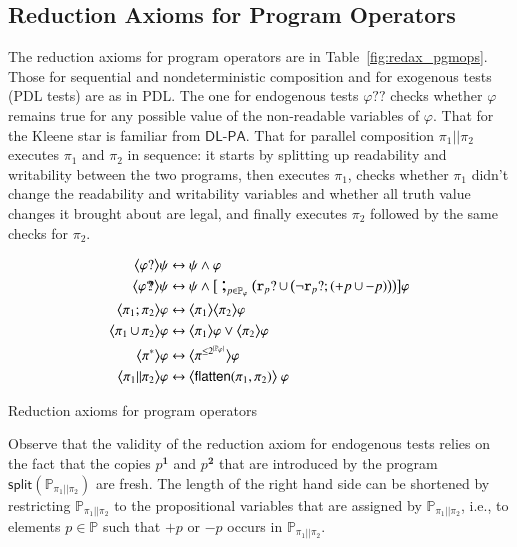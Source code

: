\documentclass{llncs}
\newcommand{\progsplit}{\mathsf{split}}
\newcommand{\progFlatten}{\mathsf{flatten}}
\newcommand{\atm}{x}
\newcommand{\cp}[2]{{#2}^\mathbf{#1}}
\newcommand{\pll}{ {||} }							%
\newcommand{\readable}[1]{\mathtt{r}_{#1}}
\newcommand{\testendo}{?\!\!?}			%
\newcommand{\testpdl}{?}				%
\newcommand{\Dlpa}{\ensuremath{\mathsf{DL\text{-}PA}}\xspace}
\newcommand{\assgntopV}[1]{{\mathtt {+} #1}}
\newcommand{\assgnbotV}[1]{{\mathtt {-} #1}}
\newcommand{\card}[1]{|#1|}
\newcommand{\lbox}[1]{ \big[ #1 \big] }
\newcommand{\ldia}[1]{ \big\langle #1 \big\rangle}
\newcommand{\leqv}{ \leftrightarrow }
\newcommand{\ndet}{\,{\cup}\,}
\renewcommand{\phi}{\varphi}
\newcommand{\propset}{\mathbb P}
\newcommand{\propsetOf}[1]{\propset_{#1}}
\newcommand{\seqseq}[1]{ \text{\Large ;}_{#1} ~ }
\begin{document}
\subsection{Reduction Axioms for Program Operators}\label{sec:redax_pgmop} 

The reduction axioms for program operators are in Table~\ref{fig:redax_pgmops}.
Those for sequential and nondeterministic composition and for exogenous tests (PDL tests) are as in PDL. 
The one for endogenous tests $ \phi \testendo$ 
checks whether $\phi$ remains true for any possible value of the non-readable variables of $\phi$. 
That for the Kleene star is familiar from \Dlpa. 
That for parallel composition $\pi_1 \pll \pi_2$ executes $\pi_1$ and $\pi_2$ in sequence:
it starts by splitting up readability and writability between the two programs,
then executes $\pi_1$, checks whether $\pi_1$ didn't change the readability and writability variables
and whether all truth value changes it brought about are legal, 
and finally executes $\pi_2$ followed by the same checks for $\pi_2$.

\begin{table}[t]
\begin{align*}
\ldia{\phi \testpdl } \psi \leqv &\ \psi \land \phi
\\
\ldia{\phi \testendo } \psi \leqv &\ \psi \land \lbox{ ~ \seqseq{p \in \propsetOf \phi} \big(
\readable{p} \testpdl \ndet \big( \lnot \readable{p} \testpdl ; (\assgntopV{p} \ndet \assgnbotV{p}) \big) 
\big) } \phi
\\
\ldia{\pi_1 ; \pi_2}  \phi \leqv &\ \ldia{\pi_1 } \ldia{\pi_2}  \phi 
\\
\ldia{\pi_1 \ndet \pi_2}  \phi \leqv &\ \ldia{\pi_1 } \phi \lor \ldia{\pi_2}  \phi 
\\
\ldia{\pi^\ast}  \phi \leqv &\ \ldia{\pi^{\leq 2^{\card{\propsetOf{\phi}}}} }  \phi   
\\
\ldia{\pi_1 \pll \pi_2}  \phi \leqv &\ \ldia{ \progFlatten(\pi_1, \pi_2) } ~ \phi 
\end{align*}
\caption{Reduction axioms for program operators
\label{fig:redax_pgmops}
}
\end{table}

Observe that the validity of the reduction axiom for endogenous tests relies on the fact that the copies  
$\cp 1 p$ and $\cp 2 p$ that are introduced by the program 
$\progsplit( \propsetOf{\pi_1 \pll \pi_2} ) $ are fresh. 
%
%
The length of the right hand side can be shortened by restricting 
$\propsetOf{\pi_1 \pll \pi_2}$ to the propositional variables that are assigned by $\propsetOf{\pi_1 \pll \pi_2}$, i.e., 
to elements $p \in \propset$ such that $\assgntopV p$ or $\assgnbotV p$ occurs in $\propsetOf{\pi_1 \pll \pi_2}$.
\end{document}
